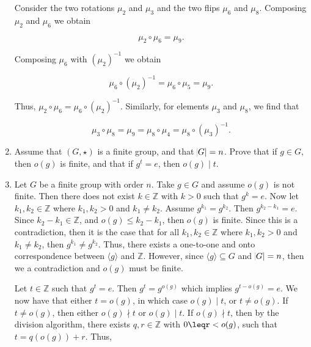 \documentclass[12pt]{article}
\makeatletter
\theoremstyle{definition}
\theoremstyle{remark}
\renewenvironment{proof}[1][\proofname]{\par
  \pushQED{\qed}%
  \normalfont \topsep6\p@\@plus6\p@\relax
  \list{}{\leftmargin=0mm
          \rightmargin=4mm
          \settowidth{\itemindent}{\itshape#1}%
          \labelwidth=\itemindent
          \parsep=0pt \listparindent=\parindent 
  }
  \item[\hskip\labelsep
        \itshape
    #1\@addpunct{.}]\ignorespaces
}{%
  \popQED\endlist\@endpefalse
}
\let\oldproofname=\proofname
\renewcommand{\proofname}{\bf{\textit{\oldproofname}}}
\makeatother
\begin{document}
\begin{enumerate}[leftmargin=*]
\noindent Consider the two rotations $\mu_2$ and $\mu_3$ and the two flips $\mu_6$ and $\mu_8$. Composing $\mu_2$ and $\mu_6$ we obtain 

\begin{equation*}
    \mu_2\circ\mu_6 =\mu_9.
\end{equation*}

\noindent Composing $\mu_6$ with $(\mu_2)^{-1}$ we obtain

\begin{equation*}
    \mu_6\circ(\mu_2)^{-1}=\mu_6\circ\mu_5=\mu_9.
\end{equation*}

Thus, $\mu_2\circ\mu_6=\mu_6\circ(\mu_2)^{-1}$. Similarly, for elements $\mu_3$ and $\mu_8$, we find that 

\begin{equation*}
    \mu_3\circ\mu_8=\mu_9=\mu_8\circ\mu_4=\mu_8\circ(\mu_3)^{-1}.
\end{equation*}

\newpage

\item Assume that $(G,\star)$ is a finite group, and that $\abs{G}=n$. Prove that if $g\in G$, then $o(g)$ is finite, and that if $g^t=e$, then $o(g)\mid t$.

\begin{proof}
    Let $G$ be a finite group with order $n$. Take $g\in G$ and assume $o(g)$ is not finite. Then there does not exist $k\in\mathbb{Z}$ with $k>0$ such that $g^k=e$. Now let $k_1,k_2\in\mathbb{Z}$ where $k_1,k_2>0$ and $k_1\neq k_2$. Assume $g^{k_1}=g^{k_2}$. Then $g^{k_2-k_1}=e$. Since $k_2-k_1\in\mathbb{Z}$, and $o(g)\leq k_2-k_1$, then $o(g)$ is finite. Since this is a contradiction, then it is the case that for all $k_1,k_2\in\mathbb{Z}$ where $k_1,k_2>0$ and $k_1\neq k_2$, then $g^{k_1}\neq g^{k_2}$. Thus, there exists a one-to-one and onto correspondence between $\langle g\rangle$ and $\mathbb{Z}$. However, since $\langle g\rangle\subseteq G$ and $\abs{G}=n$, then we a contradiction and $o(g)$ must be finite.\par\hspace{4mm} Let $t\in\mathbb{Z}$ such that $g^t=e$. Then $g^t=g^{o(g)}$ which implies $g^{t-o(g)}=e$. We now have that either $t=o(g)$, in which case $o(g)\mid t$, or $t\neq o(g)$. If $t\neq o(g)$, then either $o(g)\nmid t$ or $o(g)\mid t$. If $o(g)\nmid t$, then by the division algorithm, there exists $q,r\in\mathbb{Z}$ with $0\leqr<o(g)$, such that $t=q(o(g))+r$. Thus,
    

\end{proof}
\end{enumerate}
\end{document}
